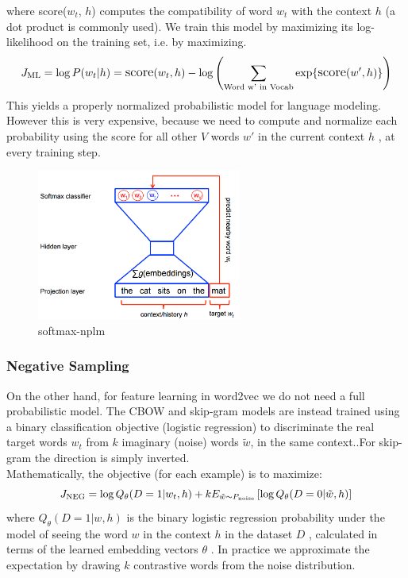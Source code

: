 where \text score({$w_t$}, $h$) computes the compatibility of word ${w_t}$ with the context ${h}$ (a dot product is commonly used). We train this model by maximizing its log-likelihood on the training set, i.e. by maximizing. 
 \begin{equation}
        \large 
           J_\text{ML} = \log P(w_t | h)
                       = \text{score} (w_t, h) -
                       \log \left( \sum_\text{Word w' in Vocab} \exp\{ \text{score} (w', h) \} \right)
 \end{equation}
 This yields a properly normalized probabilistic model for language modeling. However this is very expensive, because we need to compute and normalize each probability using the score for all other $V$  words $w'$ in the current context $h$ , at every training step.
\begin{figure}[H]%
    \center%
    \includegraphics[width=0.6\textwidth]{images/amira/softmax-nplm.png}%
    \caption[Word2vec architecture]{softmax-nplm}\label{fig:softmax}%
  \end{figure}
  

\subsubsection{Negative Sampling}
On the other hand, for feature learning in word2vec we do not need a full probabilistic model. The CBOW and skip-gram models are instead trained using a binary classification objective (logistic regression) to discriminate the real target words $w_t$ from $k$ imaginary (noise) words $\tilde w$, in the same context..For skip-gram the direction is simply inverted.\\ Mathematically, the objective (for each example) is to maximize:
  \begin{equation}
     \large
        J_\text{NEG} = \log Q_\theta(D=1 |w_t, h) +
        k {\space{E}}_{\tilde w \sim P_\text{noise}}
        \left[ \log Q_\theta(D = 0 |\tilde w, h) \right]
  \end{equation}
  where $Q_\theta(D=1 | w, h)$  is the binary logistic regression probability under the model of seeing the word $w$ in the context $h$ in the dataset $D$ , calculated in terms of the learned embedding vectors $\theta$ . In practice we approximate the expectation by drawing $k$  contrastive words from the noise distribution.

